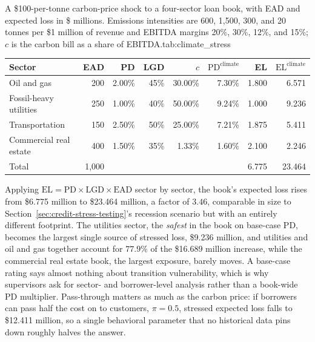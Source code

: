 \documentclass[../ai_in_finance]{subfiles}
\begin{document}
\begin{booktable}{A \$100-per-tonne carbon-price shock to a four-sector loan book, with EAD and expected loss in \$ millions. Emissions intensities are 600, 1{,}500, 300, and 20 tonnes per \$1 million of revenue and EBITDA margins 20\%, 30\%, 12\%, and 15\%; $c$ is the carbon bill as a share of EBITDA.}{tab:climate_stress}
\begin{tabular}{lrrrrrrr}
\toprule
Sector & EAD & PD & LGD & $c$ & $\text{PD}^{\text{climate}}$ & EL & $\text{EL}^{\text{climate}}$ \\
\midrule
Oil and gas & 200 & 2.00\% & 45\% & 30.00\% & 7.30\% & 1.800 & 6.571 \\
Fossil-heavy utilities & 250 & 1.00\% & 40\% & 50.00\% & 9.24\% & 1.000 & 9.236 \\
Transportation & 150 & 2.50\% & 50\% & 25.00\% & 7.21\% & 1.875 & 5.411 \\
Commercial real estate & 400 & 1.50\% & 35\% & 1.33\% & 1.60\% & 2.100 & 2.246 \\
\midrule
Total & 1{,}000 & & & & & 6.775 & 23.464 \\
\bottomrule
\end{tabular}
\end{booktable}

Applying $\text{EL} = \text{PD} \times \text{LGD} \times \text{EAD}$ sector by sector, the book's expected loss rises from \$6.775 million to \$23.464 million, a factor of $3.46$, comparable in size to Section~\ref{sec:credit-stress-testing}'s recession scenario but with an entirely different footprint. The utilities sector, the \emph{safest} in the book on base-case PD, becomes the largest single source of stressed loss, \$9.236 million, and utilities and oil and gas together account for $77.9\%$ of the \$16.689 million increase, while the commercial real estate book, the largest exposure, barely moves. A base-case rating says almost nothing about transition vulnerability, which is why supervisors ask for sector- and borrower-level analysis rather than a book-wide PD multiplier. Pass-through matters as much as the carbon price: if borrowers can pass half the cost on to customers, $\pi=0.5$, stressed expected loss falls to \$12.411 million, so a single behavioral parameter that no historical data pins down roughly halves the answer.
\end{document}
